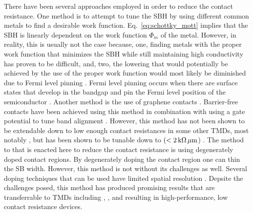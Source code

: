 There have been several approaches employed in order to reduce the contact resistance. One method is to attempt to tune the \acs{SBH} by using different common metals to find a desirable work function. Eq.~\ref{eq:schottky_mott} implies that the \acs{SBH} is linearly dependent on the work function $\Phi_m$ of the metal. However, in reality, this is usually not the case because, one, finding metals with the proper work function that minimizes the \acs{SBH} while still maintaining high conductivity has proven to be difficult, and, two, the lowering that would potentially be achieved by the use of the proper work function would most likely be diminished due to Fermi level pinning \cite{Liu_ACSnano2012,Das_NanoLett2012,Liu_arxiv2016}. Fermi level pinning occurs when there are surface states that develop in the bandgap and pin the Fermi level position of the semiconductor \cite{Tung_AppPhysRev2014}. Another method is the use of graphene contacts \cite{HJ_Chuang_NanoLett2014,Das_NanoLett2014,Roy_ACSnano2014}. Barrier-free contacts have been achieved using this method in combination with  using a gate potential to tune band alignment \cite{Liu_NanoLett2015}. However, this method has not been shown to be extendable down to low enough contact resistances in some other \acp{TMD}, most notably , but has been shown to be tunable down to $(<2\,\mathrm{k\Omega}\,\mathrm{\mu m}$) \cite{Chuang_2016,HJ_Chuang_NanoLett2014}. The method to that is enacted here to reduce the contact resistance is using degenerately doped contact regions. By degenerately doping the contact region one can thin the \acs{SB} width. However, this method is not without its challenges as well. Several doping techniques that can be used have limited spatial resolution \cite{Farmanbar_arxiv2016}. Depsite the challenges posed, this method has produced promising results that are transferrable to \acp{TMD} including , , and  resulting in high-performance, low contact resistance devices. \\ \\

